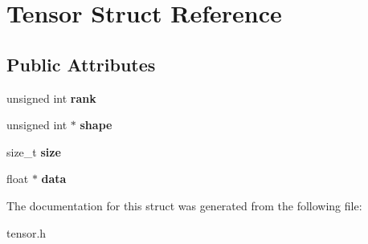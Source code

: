 \hypertarget{structTensor}{}\section{Tensor Struct Reference}
\label{structTensor}
\subsection*{Public Attributes}
\begin{DoxyCompactItemize}
\item 
unsigned int {\bfseries rank}\hypertarget{structTensor_a4ac7ae12446a4fb98e536179c258f628}{}\label{structTensor_a4ac7ae12446a4fb98e536179c258f628}

\item 
unsigned int $\ast$ {\bfseries shape}\hypertarget{structTensor_a69f81695b66bb17acc69ffcc5e46bb2c}{}\label{structTensor_a69f81695b66bb17acc69ffcc5e46bb2c}

\item 
size\+\_\+t {\bfseries size}\hypertarget{structTensor_ab0da35357729fc9ff17cdce4217ba1af}{}\label{structTensor_ab0da35357729fc9ff17cdce4217ba1af}

\item 
float $\ast$ {\bfseries data}\hypertarget{structTensor_afbb56f08fb019783b7b54e68d6b69207}{}\label{structTensor_afbb56f08fb019783b7b54e68d6b69207}

\end{DoxyCompactItemize}


The documentation for this struct was generated from the following file\+:\begin{DoxyCompactItemize}
\item 
tensor.\+h\end{DoxyCompactItemize}
